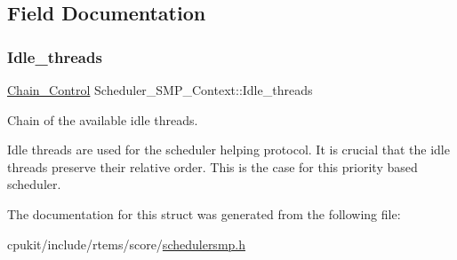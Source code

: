 \subsection{Field Documentation}
\mbox{\label{structScheduler__SMP__Context_aad00b8bfe7c6cdd61f3e78f6da12acf6}} 
\subsubsection{\texorpdfstring{Idle\_threads}{Idle\_threads}}
{\footnotesize\ttfamily \mbox{\hyperlink{unionChain__Control}{Chain\+\_\+\+Control}} Scheduler\+\_\+\+S\+M\+P\+\_\+\+Context\+::\+Idle\+\_\+threads}



Chain of the available idle threads. 

Idle threads are used for the scheduler helping protocol. It is crucial that the idle threads preserve their relative order. This is the case for this priority based scheduler. 

The documentation for this struct was generated from the following file\+:\begin{DoxyCompactItemize}
\item 
cpukit/include/rtems/score/\mbox{\hyperlink{schedulersmp_8h}{schedulersmp.\+h}}\end{DoxyCompactItemize}
